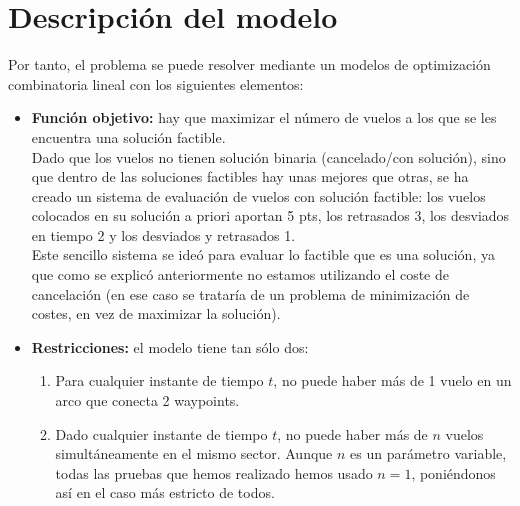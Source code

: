 \section{Descripción del modelo}
Por tanto, el problema se puede resolver mediante un modelos de optimización combinatoria lineal con los siguientes elementos:
\begin{itemize}
	\item \textbf{Función objetivo:} hay que maximizar el número de vuelos a los que se les encuentra una solución factible.\\
	 Dado que los vuelos no tienen solución binaria (cancelado/con solución), sino que dentro de las soluciones factibles hay unas mejores que otras, se ha creado un sistema de evaluación de vuelos con solución factible: los vuelos colocados en su solución a priori aportan 5 pts, los retrasados 3, los desviados en tiempo 2 y los desviados y retrasados 1.\\
	 Este sencillo sistema se ideó para evaluar lo factible que es una solución, ya que como se explicó anteriormente no estamos utilizando el coste de cancelación (en ese caso se trataría de un problema de minimización de costes, en vez de maximizar la solución).
	\item \textbf{Restricciones:} el modelo tiene tan sólo dos:
	\begin{enumerate}
		\item Para cualquier instante de tiempo $t$, no puede haber más de 1 vuelo en un arco que conecta 2 waypoints. 
		\item Dado cualquier instante de tiempo $t$, no puede haber más de $n$ vuelos simultáneamente en el mismo sector. Aunque $n$ es un parámetro variable, todas las pruebas que hemos realizado hemos usado $n=1$, poniéndonos así en el caso más estricto de todos.
	\end{enumerate}
\end{itemize}
\clearpage
